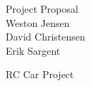\documentclass[12pt]{article}
\begin{document}
\begin{center}
Project Proposal\\
Weston Jensen\\
David Christensen\\
Erik Sargent\\
\end{center}

RC Car Project
\end{document}

